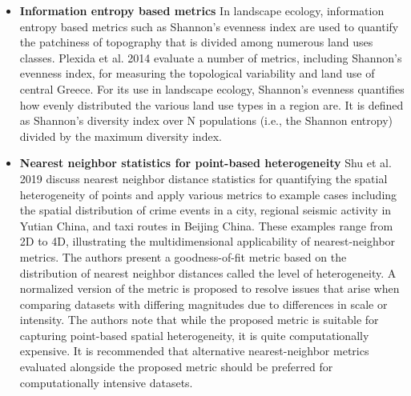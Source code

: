 \begin{itemize}
\item {\bf Information entropy based metrics} In landscape ecology, information entropy based metrics such as Shannon’s evenness index are used to quantify the patchiness of topography that is divided among numerous land uses classes. Plexida et al. 2014 evaluate a number of metrics, including Shannon’s evenness index, for measuring the topological variability and land use of central Greece. For its use in landscape ecology, Shannon’s evenness quantifies how evenly distributed the various land use types in a region are. It is defined as Shannon’s diversity index over N populations (i.e., the Shannon entropy) divided by the maximum diversity index. 
\item {\bf Nearest neighbor statistics for point-based heterogeneity} Shu et al. 2019 discuss nearest neighbor distance statistics for quantifying the spatial heterogeneity of points and apply various metrics to example cases including the spatial distribution of crime events in a city, regional seismic activity in Yutian China, and taxi routes in Beijing China. These examples range from 2D to 4D, illustrating the multidimensional applicability of nearest-neighbor metrics. The authors present a goodness-of-fit metric based on the distribution of nearest neighbor distances called the level of heterogeneity. A normalized version of the metric is proposed to resolve issues that arise when comparing datasets with differing magnitudes due to differences in scale or intensity. The authors note that while the proposed metric is suitable for capturing point-based spatial heterogeneity, it is quite computationally expensive. It is recommended that alternative nearest-neighbor metrics evaluated alongside the proposed metric should be preferred for computationally intensive datasets. 

\end{itemize}